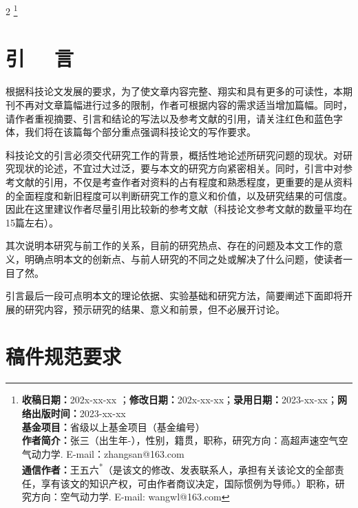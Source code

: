 \documentclass{kqdlxxb}
\begin{document}
\maketitle

\begin{multicols}{2}
  \footnote{\textbf{收稿日期：}202x-xx-xx ；\textbf{修改日期：}202x-xx-xx；\textbf{录用日期：}2023-xx-xx；\textbf{网络出版时间：}2023-xx-xx\\     %
  \textbf{基金项目：}省级以上基金项目（基金编号）\\
  \textbf{作者简介：}张三（出生年-），性别，籍贯，职称，研究方向：高超声速空气空气动力学. E-mail：zhangsan@163.com  \\
  \textbf{通信作者：}王五六\textsuperscript{*}（是该文的修改、发表联系人，承担有关该论文的全部责任，享有该文的知识产权，可由作者商议决定，国际惯例为导师。）职称，研究方向：空气动力学. E-mail: wangwl@163.com}
\end{multicols}
\clearpage


\section{引 \ \ 言}

根据科技论文发展的要求\cite{刘炜201348,李志辉1996阿波罗指令舱稀薄气体动力学特征的蒙特卡罗数值模拟}，为了使文章内容完整、翔实和具有更多的可读性\cite{庄逢甘2006未来空间飞行器的某些发展和空气动力学的任务}，本期刊不再对文章篇幅进行过多的限制，作者可根据内容的需求适当增加篇幅。同时，请作者重视摘要、引言和结论的写法以及参考文献的引用，请关注红色和蓝色字体，我们将在该篇每个部分重点强调科技论文的写作要求。

科技论文的引言必须交代研究工作的背景，概括性地论述所研究问题的现状。对研究现状的论述，不宜过大过泛，要与本文的研究方向紧密相关\cite{2022-xx}。同时，引言中对参考文献的引用，不仅是考查作者对资料的占有程度和熟悉程度，更重要的是从资料的全面程度和新旧程度可以判断研究工作的意义和价值，以及研究结果的可信度。因此在这里建议作者尽量引用比较新的参考文献（科技论文参考文献的数量平均在15篇左右）。

其次说明本研究与前工作的关系，目前的研究热点、存在的问题及本文工作的意义，明确点明本文的创新点、与前人研究的不同之处或解决了什么问题，使读者一目了然。

引言最后一段可点明本文的理论依据、实验基础和研究方法，简要阐述下面即将开展的研究内容，预示研究的结果、意义和前景，但不必展开讨论。

\section{稿件规范要求}
\end{document}
